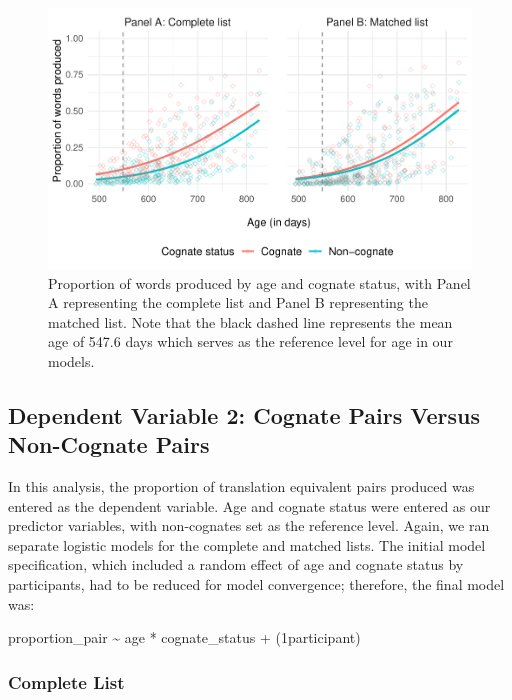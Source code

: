 \documentclass[
  ,man,floatsintext]{apa6}
\begin{document}
\begin{figure}[H]

{\centering \includegraphics[width=1.2\linewidth]{CogVocab_paper_files/figure-latex/Fig1-1} 

}

\caption{Proportion of words produced by age and cognate status, with Panel A representing the complete list and Panel B representing the matched list. Note that the black dashed line represents the mean age of 547.6 days which serves as the reference level for age in our models.}\label{fig:Fig1}
\end{figure}

\hypertarget{dependent-variable-2-cognate-pairs-versus-non-cognate-pairs}{%
\subsection{Dependent Variable 2: Cognate Pairs Versus Non-Cognate Pairs}\label{dependent-variable-2-cognate-pairs-versus-non-cognate-pairs}}

In this analysis, the proportion of translation equivalent pairs produced was entered as the dependent variable. Age and cognate status were entered as our predictor variables, with non-cognates set as the reference level. Again, we ran separate logistic models for the complete and matched lists. The initial model specification, which included a random effect of age and cognate status by participants, had to be reduced for model convergence; therefore, the final model was:

proportion\_pair \textasciitilde{} age * cognate\_status + (1\textbar participant)

\hypertarget{complete-list-1}{%
\subsubsection{Complete List}\label{complete-list-1}}
\end{document}
